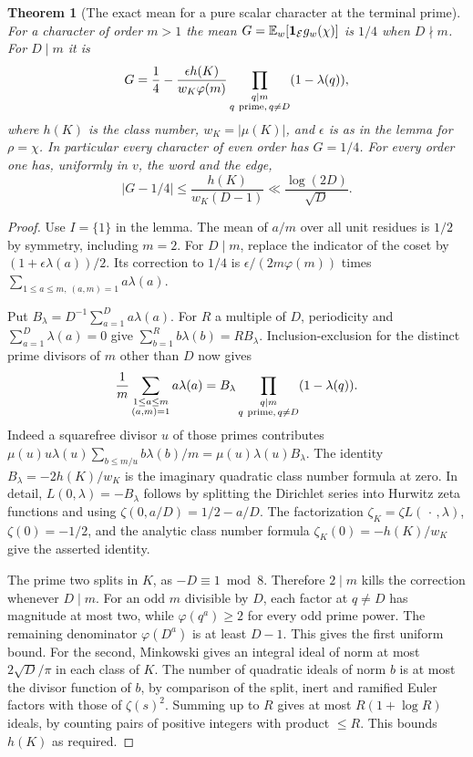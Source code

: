 \documentclass[a4paper,11pt]{article}
\newtheorem{theorem}[proposition]{Theorem}
\theoremstyle{definition}
\theoremstyle{remark}
\numberwithin{equation}{section}
\begin{document}
\begin{theorem}[The exact mean for a pure scalar character at the terminal prime]\leavevmode
\label{thm:classgauss508}
For a character of order \(m>1\) the mean
\(G=\mathbb E_w[{\bf1}_{\mathcal E}g_w(\chi)]\) is \(1/4\)
when \(D\nmid m\). For \(D\mid m\) it is
\[
 G=\frac14-\frac{\epsilon h(K)}
                     {w_K\varphi(m)}
                   \prod_{\substack{q\mid m\\q\ {\rm prime},\,q\ne D}}
                              (1-\lambda(q)),
\]
where \(h(K)\) is the class number, \(w_K=|\mu(K)|\), and
\(\epsilon\) is as in the lemma for \(\rho=\chi\). In particular
every character of even order has \(G=1/4\). For every order
one has, uniformly in \(v\), the word and the edge,
\[
       |G-1/4|\le \frac{h(K)}{w_K(D-1)}
                        \ll\frac{\log(2D)}{\sqrt D}.
\]
\end{theorem}
\begin{proof}
Use \(I=\{1\}\) in the lemma. The mean of \(a/m\) over all
unit residues is \(1/2\) by symmetry, including \(m=2\).
For \(D\mid m\), replace the indicator of the coset by
\((1+\epsilon\lambda(a))/2\). Its correction to \(1/4\)
is \(\epsilon/(2m\varphi(m))\) times
\(\sum_{1\le a\le m,\ (a,m)=1} a\lambda(a)\).

Put \(B_\lambda=D^{-1}\sum_{a=1}^D a\lambda(a)\).
For \(R\) a multiple of \(D\), periodicity and
\(\sum_{a=1}^D\lambda(a)=0\) give
\(\sum_{b=1}^R b\lambda(b)=R B_\lambda\).
Inclusion-exclusion for the distinct prime divisors of \(m\)
other than \(D\) now gives
\[
   \frac1m\sum_{\substack{1\le a\le m\\(a,m)=1}}a\lambda(a)
      = B_\lambda\prod_{\substack{q\mid m\\q\ {\rm prime},\,q\ne D}}
                          (1-\lambda(q)).
\]
Indeed a squarefree divisor \(u\) of those primes contributes
\(\mu(u)u\lambda(u)\sum_{b\le m/u} b\lambda(b)/m
=\mu(u)\lambda(u)B_\lambda\).
The identity \(B_\lambda=-2h(K)/w_K\) is the imaginary
quadratic class number formula at zero. In detail,
\(L(0,\lambda)=-B_\lambda\) follows by splitting the Dirichlet
series into Hurwitz zeta functions and using
\(\zeta(0,a/D)=1/2-a/D\). The factorization
\(\zeta_K=\zeta L(\,\cdot\,,\lambda)\), \(\zeta(0)=-1/2\),
and the analytic class number formula
\(\zeta_K(0)=-h(K)/w_K\) give the asserted identity.

The prime two splits in \(K\), as \(-D\equiv1\bmod8\).
Therefore \(2\mid m\) kills the correction whenever \(D\mid m\).
For an odd \(m\) divisible by \(D\), each factor at \(q\ne D\)
has magnitude at most two, while \(\varphi(q^a)\ge2\) for
every odd prime power. The remaining denominator
\(\varphi(D^a)\) is at least \(D-1\). This gives the first
uniform bound. For the second, Minkowski gives an integral
ideal of norm at most \(2\sqrt D/\pi\) in each class of \(K\).
The number of quadratic ideals of norm \(b\) is at most the
divisor function of \(b\), by comparison of the split, inert
and ramified Euler factors with those of \(\zeta(s)^2\).
Summing up to \(R\) gives at most \(R(1+\log R)\) ideals,
by counting pairs of positive integers with product \(\le R\).
This bounds \(h(K)\) as required.
\end{proof}
\end{document}
